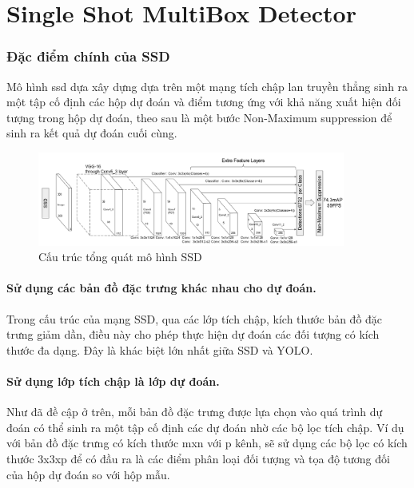 \documentclass[a4paper]{report}
\begin{document}
\section{Single Shot MultiBox Detector}
\subsubsection{Đặc điểm chính của SSD}
Mô hình ssd dựa xây dựng dựa trên một mạng tích chập lan truyền thẳng sinh ra một tập cố định các hộp dự đoán và điểm tương ứng với khả năng xuất hiện đối tượng trong hộp dự đoán, theo sau là một bước Non-Maximum suppression để sinh ra kết quả dự đoán cuối cùng. \\

\begin{figure}[h!]
	\centering
	\includegraphics[width=0.9\textwidth]{3_ssd_arch.png}
	\caption[Caption for LOF]{Cấu trúc tổng quát mô hình SSD \cite{ssd}}
\end{figure}

\paragraph*{Sử dụng các bản đồ đặc trưng khác nhau cho dự đoán.} Trong cấu trúc của mạng SSD, qua các lớp tích chập, kích thước bản đồ đặc trưng giảm dần, điều này cho phép thực hiện dự đoán các đối tượng có kích thước đa dạng. Đây là khác biệt lớn nhất giữa SSD và YOLO.\\

\paragraph*{Sử dụng lớp tích chập là lớp dự đoán.} Như đã đề cập ở trên, mỗi bản đồ đặc trưng được lựa chọn vào quá trình dự đoán có thể sinh ra một tập cố định các dự đoán nhờ các bộ lọc tích chập. Ví dụ với bản đồ đặc trưng có kích thước mxn với p kênh,  sẽ sử dụng các bộ lọc có kích thước 3x3xp để có đầu ra là các điểm phân loại đối tượng và tọa độ tương đối của hộp dự đoán so với hộp mẫu.\\
\end{document}

